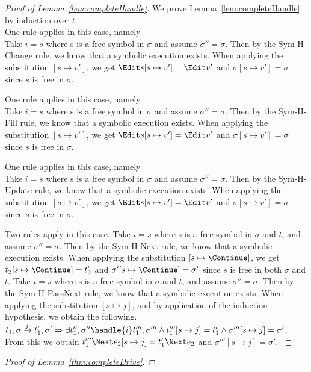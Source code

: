 \begin{proof}[Proof of Lemma~\ref{lem:completeHandle}]

  We prove Lemma~\ref{lem:completeHandle} by induction over $t$.\\

  {One rule applies in this case, namely \\
  Take $i=s$ where s is a free symbol in $\sigma$ and assume $\sigma''=\sigma$.
  Then by the Sym-H-Change rule,
  we know that a symbolic execution exists.
  When applying the substitution $[s\mapsto v']$,
  we get $\Edit s[s\mapsto v'] = \Edit v'$ and $\sigma[s\mapsto v']=\sigma$ since $s$ is free in $\sigma$.
  }

  {One rule applies in this case, namely \\
  Take $i=s$ where s is a free symbol in $\sigma$ and assume $\sigma''=\sigma$.
  Then by the Sym-H-Fill rule,
  we know that a symbolic execution exists.
  When applying the substitution $[s\mapsto v']$,
  we get $\Edit s[s\mapsto v'] = \Edit v'$ and $\sigma[s\mapsto v']=\sigma$ since $s$ is free in $\sigma$. }

  {One rule applies in this case, namely \\
  Take $i=s$ where s is a free symbol in $\sigma$ and assume $\sigma''=\sigma$.
  Then by the Sym-H-Update rule,
  we know that a symbolic execution exists.
  When applying the substitution $[s\mapsto v']$,
  we get $\Edit s[s\mapsto v'] = \Edit v'$ and $\sigma[s\mapsto v']=\sigma$ since $s$ is free in $\sigma$. }

  {Two rules apply in this case.
    {
    Take $i=s$ where s is a free symbol in $\sigma$ and $t$, and assume $\sigma''=\sigma$.
    Then by the Sym-H-Next rule,
    we know that a symbolic execution exists.
    When applying the substitution $[s\mapsto \Continue]$,
    we get $t_2[s\mapsto \Continue] = t_2'$ and $\sigma'[s\mapsto \Continue]=\sigma'$ since $s$ is free in both $\sigma$ and $t$.
    }
    {
    Take $i=s$ where s is a free symbol in $\sigma$ and $t$, and assume $\sigma''=\sigma$.
    Then by the Sym-H-PassNext rule,
    we know that a symbolic execution exists.
    When applying the substitution $[s\mapsto j]$, and by application of the induction hypothesis, we obtain the following.\\
    $t_1,\sigma\xrightarrow[]{j}t_1',\sigma'\implies \exists t_1'',\sigma''\handle{i}t_1''',\sigma'''\land t_1'''[s\mapsto j] = t_1'\land \sigma'''[s\mapsto j]=\sigma'$.\\
    From this we obtain $t_1'''\Next e_2[s\mapsto j] = t_1'\Next e_2$ and $\sigma'''[s\mapsto j]=\sigma'$.
    }
  }



\end{proof}



\begin{proof}[Proof of Lemma~\ref{thm:completeDrive}]
\end{proof}
